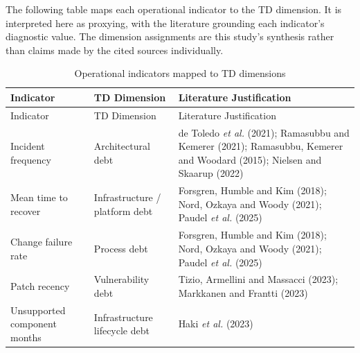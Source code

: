 \documentclass[
  12pt,
  letterpaper,
  12pt,
  oneside,
  english,
  onehalfspacing,
  headsepline]{MastersDoctoralThesis}
\begin{document}
The following table maps each operational indicator to the TD dimension.
It is interpreted here as proxying, with the literature grounding each
indicator's diagnostic value. The dimension assignments are this study's
synthesis rather than claims made by the cited sources individually.

\vspace{2cm}
\begin{samepage}
\scriptsize

\begin{longtable}[]{@{}
  >{\raggedright\arraybackslash}p{}
  >{\raggedright\arraybackslash}p{}
  >{\raggedright\arraybackslash}p{}@{}}
\caption{Operational indicators mapped to TD
dimensions}\label{tbl-indicators-lit}\tabularnewline
\toprule\noalign{}
\begin{minipage}[b]{\linewidth}\raggedright
Indicator
\end{minipage} & \begin{minipage}[b]{\linewidth}\raggedright
TD Dimension
\end{minipage} & \begin{minipage}[b]{\linewidth}\raggedright
Literature Justification
\end{minipage} \\
\midrule\noalign{}
\endfirsthead
\toprule\noalign{}
\begin{minipage}[b]{\linewidth}\raggedright
Indicator
\end{minipage} & \begin{minipage}[b]{\linewidth}\raggedright
TD Dimension
\end{minipage} & \begin{minipage}[b]{\linewidth}\raggedright
Literature Justification
\end{minipage} \\
\midrule\noalign{}
\endhead
\bottomrule\noalign{}
\endlastfoot
Incident frequency & Architectural debt & de Toledo \emph{et al.}
(2021); Ramasubbu and Kemerer (2021); Ramasubbu, Kemerer and Woodard
(2015); Nielsen and Skaarup (2022) \\
Mean time to recover & Infrastructure / platform debt & Forsgren, Humble
and Kim (2018); Nord, Ozkaya and Woody (2021); Paudel \emph{et al.}
(2025) \\
Change failure rate & Process debt & Forsgren, Humble and Kim (2018);
Nord, Ozkaya and Woody (2021); Paudel \emph{et al.} (2025) \\
Patch recency & Vulnerability debt & Tizio, Armellini and Massacci
(2023); Markkanen and Frantti (2023) \\
Unsupported component months & Infrastructure lifecycle debt & Haki
\emph{et al.} (2023) \\
\end{longtable}

\end{samepage}
\end{document}
